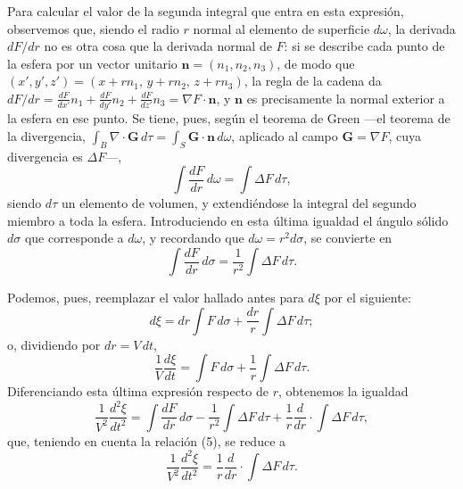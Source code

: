 Para calcular el valor de la segunda integral que entra en esta expresión,
observemos que, siendo el radio $r$ normal al elemento de superficie
$d\omega$, la derivada $dF/dr$ no es otra cosa que la derivada normal de
$F$: si se describe cada punto de la esfera por un vector unitario
$\mathbf{n}=(n_1,n_2,n_3)$, de modo que $(x',y',z')=(x+rn_1,\,y+rn_2,\,z+rn_3)$,
la regla de la cadena da
$dF/dr = \frac{dF}{dx'}n_1+\frac{dF}{dy'}n_2+\frac{dF}{dz'}n_3=\nabla F\cdot\mathbf{n}$,
y $\mathbf{n}$ es precisamente la normal exterior a la esfera en ese punto.
Se tiene, pues, según el teorema de Green —el teorema de la divergencia,
$\int_B \nabla\!\cdot\!\mathbf{G}\,d\tau=\int_S \mathbf{G}\cdot\mathbf{n}\,d\omega$,
aplicado al campo $\mathbf{G}=\nabla F$, cuya divergencia es $\Delta F$—,
\[
\int \frac{dF}{dr}\,d\omega = \int \Delta F\,d\tau,
\]
siendo $d\tau$ un elemento de volumen, y extendiéndose la integral del
segundo miembro a toda la esfera. Introduciendo en esta última igualdad el
ángulo sólido $d\sigma$ que corresponde a $d\omega$, y recordando que
$d\omega=r^2d\sigma$, se convierte en
\[
\int \frac{dF}{dr}\,d\sigma = \frac{1}{r^2}\int \Delta F\,d\tau. \tag{5}
\]

Podemos, pues, reemplazar el valor hallado antes para $d\xi$ por el
siguiente:
\[
d\xi = dr\int F\,d\sigma + \frac{dr}{r}\int \Delta F\,d\tau;
\]
o, dividiendo por $dr=V\,dt$,
\[
\frac{1}{V}\frac{d\xi}{dt} = \int F\,d\sigma + \frac{1}{r}\int \Delta F\,d\tau. \tag{6}
\]
Diferenciando esta última expresión respecto de $r$, obtenemos la igualdad
\[
\frac{1}{V^2}\frac{d^2\xi}{dt^2} = \int \frac{dF}{dr}\,d\sigma -
\frac{1}{r^2}\int \Delta F\,d\tau + \frac{1}{r}\frac{d}{dr}\cdot\int \Delta F\,d\tau,
\]
que, teniendo en cuenta la relación (5), se reduce a
\[
\frac{1}{V^2}\frac{d^2\xi}{dt^2} = \frac{1}{r}\frac{d}{dr}\cdot\int \Delta F\,d\tau. \tag{7}
\]


